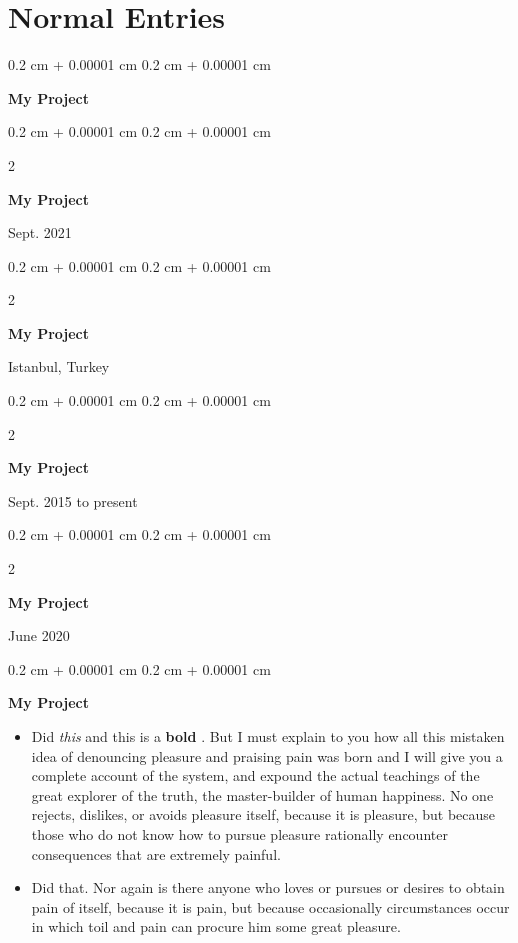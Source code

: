 \documentclass[10pt, letterpaper]{article}
\newenvironment{highlights}{
    \begin{itemize}[
        topsep=0.10 cm,
        parsep=0.10 cm,
        partopsep=0pt,
        itemsep=0pt,
        leftmargin=0.4 cm + 10pt
    ]
}{
    \end{itemize}
} %
\newenvironment{onecolentry}{
    \begin{adjustwidth}{
        0.2 cm + 0.00001 cm
    }{
        0.2 cm + 0.00001 cm
    }
}{
    \end{adjustwidth}
} %
\newenvironment{twocolentry}[2][]{
    \onecolentry
    \def\secondColumn{#2}
    \setcolumnwidth{\fill, 4.5 cm}
    \begin{paracol}{2}
}{
    \switchcolumn \raggedleft \secondColumn
    \end{paracol}
    \endonecolentry
} %
\let\hrefWithoutArrow\href
\renewcommand{\href}[2]{\hrefWithoutArrow{#1}{\mbox{\ifthenelse{\equal{#2}{}}{ }{#2 }\raisebox{.15ex}{\footnotesize \faExternalLink*}}}}
\begin{document}
    
    \section{Normal Entries}

        
        \begin{onecolentry}
            \textbf{My Project}
        \end{onecolentry}


        \vspace{0.2 cm}

        \begin{twocolentry}{
            Sept. 2021
        }
            \textbf{My Project}
        \end{twocolentry}


        \vspace{0.2 cm}

        \begin{twocolentry}{
            Istanbul, Turkey
        }
            \textbf{My Project}
        \end{twocolentry}


        \vspace{0.2 cm}

        \begin{twocolentry}{
            Sept. 2015 to present
        }
            \textbf{My Project}
        \end{twocolentry}


        \vspace{0.2 cm}

        \begin{twocolentry}{
            June 2020
        }
            \textbf{My Project}
        \end{twocolentry}


        \vspace{0.2 cm}

        \begin{onecolentry}
            \textbf{My Project}
            \begin{highlights}
                \item Did \textit{this} and this is a \textbf{bold} \href{https://example.com}{link}. But I must explain to you how all this mistaken idea of denouncing pleasure and praising pain was born and I will give you a complete account of the system, and expound the actual teachings of the great explorer of the truth, the master-builder of human happiness. No one rejects, dislikes, or avoids pleasure itself, because it is pleasure, but because those who do not know how to pursue pleasure rationally encounter consequences that are extremely painful.
                \item Did that. Nor again is there anyone who loves or pursues or desires to obtain pain of itself, because it is pain, but because occasionally circumstances occur in which toil and pain can procure him some great pleasure.
            \end{highlights}
        \end{onecolentry}
\end{document}
